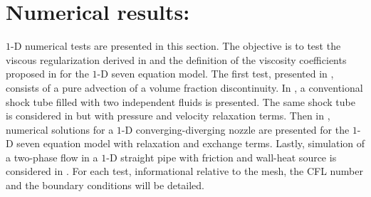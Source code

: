 \section{Numerical results:}\label{sec:1d-num-res-sect4}
$1$-D numerical tests are presented in this section. The objective is to test the viscous regularization derived in  and the definition of the viscosity coefficients proposed in  for the $1$-D seven equation model. The first test, presented in ,  consists of a pure advection of a volume fraction discontinuity. In , a conventional shock tube filled with two independent fluids is presented. The same shock tube is considered in  but with pressure and velocity relaxation terms. Then in , numerical solutions for a $1$-D converging-diverging nozzle are presented for the $1$-D seven equation model with relaxation and exchange terms. Lastly, simulation of a two-phase flow in a $1$-D straight pipe with friction and wall-heat source is considered in . For each test, informational relative to the mesh, the CFL number and the boundary conditions will be detailed.
